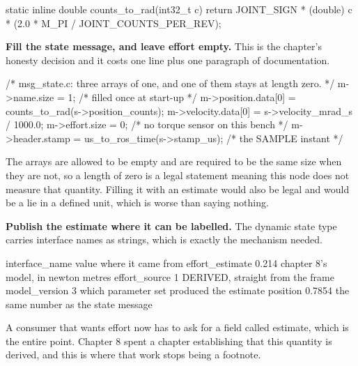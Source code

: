 \begin{steps}
\begin{ccode}
static inline double counts_to_rad(int32_t c)
{
    return JOINT_SIGN * (double) c * (2.0 * M_PI / JOINT_COUNTS_PER_REV);
}
\end{ccode}

\item \textbf{Fill the state message, and leave effort empty.} This is the
chapter's honesty decision and it costs one line plus one paragraph of
documentation.
\begin{ccode}
/* msg_state.c: three arrays of one, and one of them stays at length zero. */
m->name.size     = 1;                       /* filled once at start-up */
m->position.data[0] = counts_to_rad(s->position_counts);
m->velocity.data[0] = s->velocity_mrad_s / 1000.0;
m->effort.size   = 0;                       /* no torque sensor on this bench */
m->header.stamp  = us_to_ros_time(s->stamp_us);   /* the SAMPLE instant */
\end{ccode}
The arrays are allowed to be empty and are required to be the same size when
they are not, so a length of zero is a legal statement meaning this node does not
measure that quantity. Filling it with an estimate would also be legal and would
be a lie in a defined unit, which is worse than saying nothing.

\item \textbf{Publish the estimate where it can be labelled.} The dynamic state
type carries interface names as strings, which is exactly the mechanism needed.
\begin{plaincode}
interface_name        value        where it came from
  effort_estimate     0.214        chapter 8's model, in newton metres
  effort_source       1            DERIVED, straight from the frame
  model_version       3            which parameter set produced the estimate
  position            0.7854       the same number as the state message
\end{plaincode}
A consumer that wants effort now has to ask for a field called estimate, which is
the entire point. Chapter 8 spent a chapter establishing that this quantity is
derived, and this is where that work stops being a footnote.


\end{steps}
